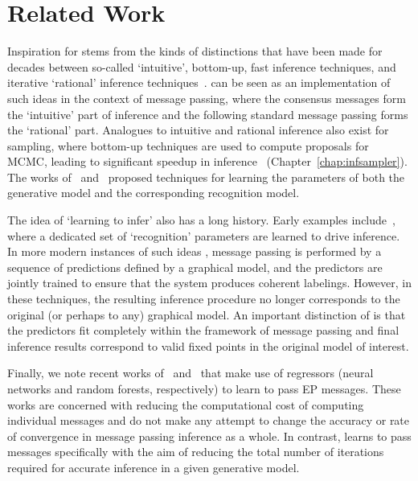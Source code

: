 \section{Related Work}
\label{sec:related-work-chap4}

Inspiration for \MTD stems from the kinds of distinctions that have been made for decades between so-called `intuitive', bottom-up, fast inference techniques, and iterative `rational' inference techniques~\citep{Hinton1990}. \MTD can be seen as an implementation of such ideas in the context of message passing, where the consensus messages form the `intuitive' part of inference and the following standard message passing forms the `rational' part. Analogues to intuitive and rational inference also exist for sampling, where bottom-up techniques are used to compute proposals for MCMC, leading to significant speedup in inference~\citep{tu2002image, stuhlmueller2013nips} (Chapter~\ref{chap:infsampler}).
The works of~\cite{rezende2014stochastic} and~\cite{kingma2013auto} proposed techniques for learning the parameters of both the generative model and the corresponding recognition model.

The idea of `learning to infer' also has a long history. Early examples include~\cite{Hinton1995}, where a dedicated set of `recognition' parameters are learned to drive inference. In more modern instances of such ideas \citep{Munoz2010, Ross2011, Domke2011, shapovalov2013spatial, Munoz2013}, message passing is performed  by a sequence of predictions defined by a graphical model, and the predictors are jointly trained to ensure that the system produces coherent labelings. However, in these techniques, the resulting inference procedure no longer corresponds to the original (or perhaps to any) graphical model. An important distinction of \MTD is that the predictors fit completely within the framework of message passing and final inference results correspond to valid fixed points in the original model of interest.

Finally, we note recent works of~\cite{Heess2013} and~\cite{Eslami2014} that make use of regressors (neural networks and random forests, respectively) to learn to pass EP messages. These works are concerned with reducing the computational cost of computing individual messages and do not make any attempt to change the accuracy or rate of convergence in message passing inference as a whole. In contrast, \MTD learns to pass messages specifically with the aim of reducing the total number of iterations required for accurate inference in a given generative model.


